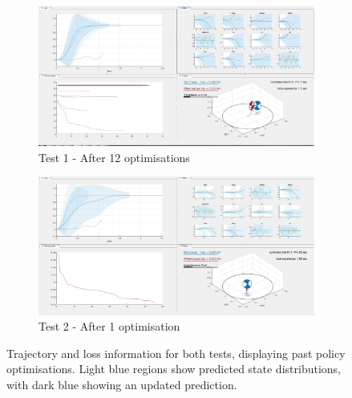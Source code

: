 \documentclass[twoside,twocolumn,12pt]{article}
\begin{document}
\begin{figure}[t]
  \centering
  \begin{subfigure}[t]{\textwidth}
  \centering
    \includegraphics[width=\linewidth]{1-12}
   \caption{Test 1 - After 12 optimisations}
  \label{fig:t112}
  \end{subfigure}
  \newline
  \begin{subfigure}[t]{\textwidth}
  \centering
    \includegraphics[width=\linewidth]{2-1}
    \caption{Test 2 - After 1 optimisation}
  \label{fig:t21}
  \end{subfigure}
  \caption{Trajectory and loss information for both tests, displaying past policy optimisations. Light blue regions show predicted state distributions, with dark blue showing an updated prediction.}
  \label{fig:rper}
\end{figure}

\clearpage


\end{document}
